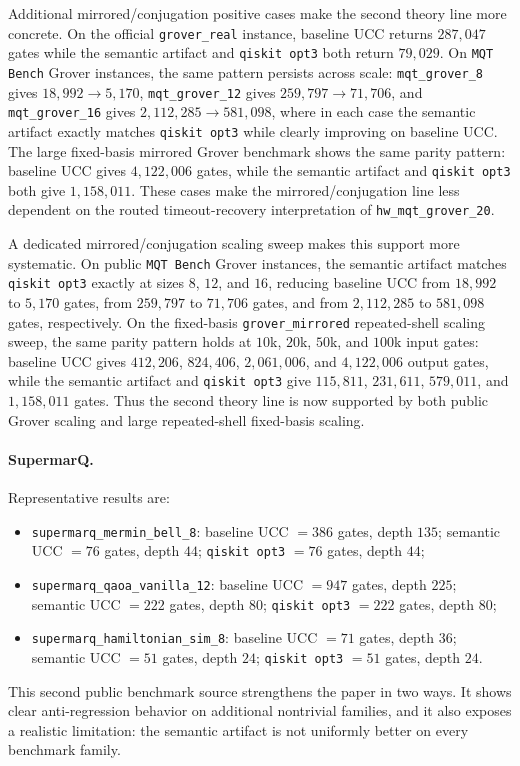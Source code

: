 \documentclass[11pt]{article}
\begin{document}
Additional mirrored/conjugation positive cases make the second theory line more
concrete. On the official \texttt{grover\_real} instance, baseline UCC returns
$287{,}047$ gates while the semantic artifact and \texttt{qiskit opt3} both return
$79{,}029$. On \texttt{MQT Bench} Grover instances, the same pattern persists
across scale: \texttt{mqt\_grover\_8} gives $18{,}992 \rightarrow 5{,}170$,
\texttt{mqt\_grover\_12} gives $259{,}797 \rightarrow 71{,}706$, and
\texttt{mqt\_grover\_16} gives $2{,}112{,}285 \rightarrow 581{,}098$, where in
each case the semantic artifact exactly matches \texttt{qiskit opt3} while clearly
improving on baseline UCC. The large fixed-basis mirrored Grover benchmark shows
the same parity pattern: baseline UCC gives $4{,}122{,}006$ gates, while
the semantic artifact and \texttt{qiskit opt3} both give $1{,}158{,}011$. These cases make the
mirrored/conjugation line less dependent on the routed timeout-recovery
interpretation of \texttt{hw\_mqt\_grover\_20}.

A dedicated mirrored/conjugation scaling sweep makes this support more
systematic. On public \texttt{MQT Bench} Grover instances, the semantic artifact
matches \texttt{qiskit opt3} exactly at sizes $8$, $12$, and $16$, reducing
baseline UCC from $18{,}992$ to $5{,}170$ gates, from $259{,}797$ to $71{,}706$
gates, and from $2{,}112{,}285$ to $581{,}098$ gates, respectively. On the
fixed-basis \texttt{grover\_mirrored} repeated-shell scaling sweep, the same
parity pattern holds at $10$k, $20$k, $50$k, and $100$k input gates:
baseline UCC gives $412{,}206$, $824{,}406$, $2{,}061{,}006$, and
$4{,}122{,}006$ output gates, while the semantic artifact and \texttt{qiskit opt3}
give $115{,}811$, $231{,}611$, $579{,}011$, and $1{,}158{,}011$ gates. Thus
the second theory line is now supported by both public Grover scaling and
large repeated-shell fixed-basis scaling.

\paragraph{SupermarQ.}
Representative results are:
\begin{itemize}[leftmargin=1.5em]
    \item \texttt{supermarq\_mermin\_bell\_8}: baseline UCC $= 386$ gates, depth $135$; semantic UCC $= 76$ gates, depth $44$; \texttt{qiskit opt3} $= 76$ gates, depth $44$;
    \item \texttt{supermarq\_qaoa\_vanilla\_12}: baseline UCC $= 947$ gates, depth $225$; semantic UCC $= 222$ gates, depth $80$; \texttt{qiskit opt3} $= 222$ gates, depth $80$;
    \item \texttt{supermarq\_hamiltonian\_sim\_8}: baseline UCC $= 71$ gates, depth $36$; semantic UCC $= 51$ gates, depth $24$; \texttt{qiskit opt3} $= 51$ gates, depth $24$.
\end{itemize}
This second public benchmark source strengthens the paper in two ways. It shows clear anti-regression behavior on additional nontrivial families, and it also exposes a realistic limitation: the semantic artifact is not uniformly better on every benchmark family.
\end{document}
